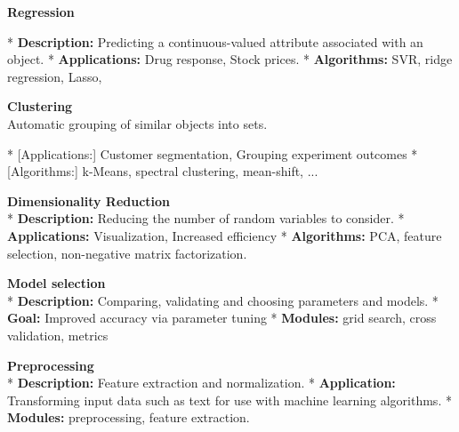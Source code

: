 

\textbf{Regression}

*   \textbf{Description:} Predicting a continuous-valued attribute associated with an object.
*   \textbf{Applications:} Drug response, Stock prices.
*   \textbf{Algorithms:} SVR, ridge regression, Lasso, 





	
\textbf{Clustering}\\

Automatic grouping of similar objects into sets.
\begin{description}
*  [Applications:] Customer segmentation, Grouping experiment outcomes
*  [Algorithms:] k-Means, spectral clustering, mean-shift, ...
\end{description}


	
\textbf{Dimensionality Reduction}\\


*   \textbf{Description: } Reducing the number of random variables to consider.
*   \textbf{Applications:} Visualization, Increased efficiency
*   \textbf{Algorithms:} PCA, feature selection, non-negative matrix factorization. 




\textbf{Model selection}\\

*   \textbf{Description: } Comparing, validating and choosing parameters and models.
*   \textbf{Goal:} Improved accuracy via parameter tuning
*   \textbf{Modules:} grid search, cross validation, metrics




\textbf{Preprocessing}\\

*   \textbf{Description:} Feature extraction and normalization.
*   \textbf{Application:} Transforming input data such as text for use with machine learning algorithms.
*   \textbf{Modules:} preprocessing, feature extraction.



